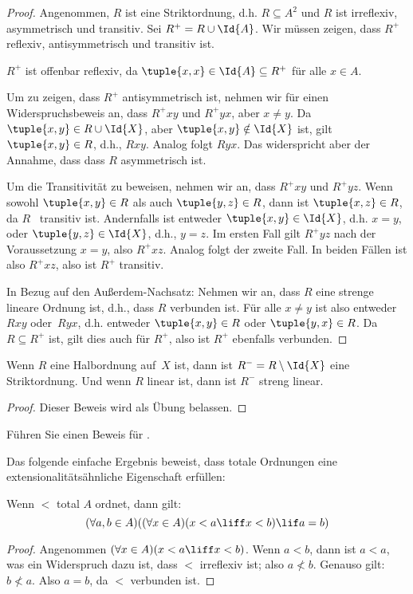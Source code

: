 \documentclass[../../../include/open-logic-section]{subfiles}
\begin{document}
\begin{proof}
Angenommen, $R$ ist eine Striktordnung, d.h. $R \subseteq A^2$ und $R$ ist
irreflexiv, asymmetrisch und transitiv. Sei $R^+ = R \cup \Id{A}$. Wir
müssen zeigen, dass $R^+$ reflexiv, antisymmetrisch und transitiv ist.

$R^+$ ist offenbar reflexiv, da $\tuple{x, x} \in \Id{A} \subseteq
R^+$ für alle $x \in A$. 

Um zu zeigen, dass $R^+$ antisymmetrisch ist, nehmen wir für einen Widerspruchsbeweis an,
dass $R^+xy$ und $R^+yx$, aber $x \neq y$.
Da $\tuple{x,y} \in R \cup \Id{X}$, aber
$\tuple{x, y} \notin \Id{X}$ ist, gilt $\tuple{x, y} \in R$, d.h.,
$Rxy$. Analog folgt $Ryx$. Das widerspricht aber der Annahme, dass
dass $R$ asymmetrisch ist.

Um die Transitivität zu beweisen, nehmen wir an, dass $R^+xy$ und $R^+yz$. Wenn sowohl
$\tuple{x, y} \in R$ als auch $\tuple{y,z} \in R$, dann ist $\tuple{x, z} \in
R$, da $R$~ transitiv ist. Andernfalls ist entweder $\tuple{x, y} \in
\Id{X}$, d.h. $x = y$, oder $\tuple{y, z} \in \Id{X}$, d.h., $y = z$.
Im ersten Fall gilt $R^+yz$ nach der Voraussetzung $x = y$, also
$R^+xz$. Analog folgt der zweite Fall. In beiden Fällen ist also $R^+xz$,
also ist $R^+$ transitiv.

In Bezug auf den \glqq Außerdem\grqq{}-Nachsatz: Nehmen wir an, dass $R$ eine strenge lineare Ordnung ist,
d.h., dass $R$ verbunden ist. Für alle $x \neq y$ ist also entweder $Rxy$
oder~$Ryx$, d.h. entweder $\tuple{x, y} \in R$ oder $\tuple{y, x} \in R$.
Da $R \subseteq R^+$ ist, gilt dies auch für $R^+$, also ist $R^+$
ebenfalls verbunden.
\end{proof}

\begin{prop}
Wenn $R$ eine Halbordnung auf~$X$ ist, dann ist $R^- = R \setminus \Id{X}$ eine
Striktordnung. Und wenn $R$ linear ist, dann ist $R^-$ streng linear.
\end{prop}

\begin{proof}
Dieser Beweis wird als Übung belassen.
\end{proof}

\begin{prob}
Führen Sie einen Beweis für . 
\end{prob}

Das folgende einfache Ergebnis beweist, dass totale Ordnungen
eine extensionalitätsähnliche Eigenschaft erfüllen:

\begin{prop}
Wenn $<$ total $A$ ordnet, dann gilt: 
\[
  (\forall a, b \in A)((\forall x \in A)(x < a \liff x < b) \lif a = b)
\]
\end{prop}

\begin{proof}
Angenommen $(\forall x \in A)(x < a \liff x < b)$. Wenn $a < b$, dann ist $a <
a$, was ein Widerspruch dazu ist, dass $<$ irreflexiv ist; also $a \nless b$.
Genauso gilt: $b \nless a$. Also $a = b$, da $<$ verbunden ist.
\end{proof}
\end{document}
